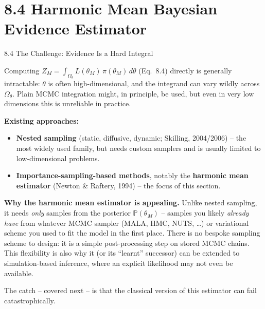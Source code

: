 \documentclass[aspectratio=169,10pt]{beamer}
\begin{document}
\section{8.4 Harmonic Mean Bayesian Evidence Estimator}

\begin{frame}[allowframebreaks]{8.4 The Challenge: Evidence Is a Hard Integral}

Computing $Z_M = \int_{\Omega_\theta} L(\theta_M)\, \pi(\theta_M)\, d\theta$ (Eq.\ 8.4) directly is generally intractable: $\theta$ is often high-dimensional, and the integrand can vary wildly across $\Omega_\theta$. Plain MCMC integration might, in principle, be used, but even in very low dimensions this is unreliable in practice.

\textbf{Existing approaches:}
\begin{itemize}
  \item \textbf{Nested sampling} (static, diffusive, dynamic; Skilling, 2004/2006) -- the most widely used family, but needs custom samplers and is usually limited to low-dimensional problems.
  \item \textbf{Importance-sampling-based methods}, notably the \textbf{harmonic mean estimator} (Newton \& Raftery, 1994) -- the focus of this section.
\end{itemize}

\framebreak

\textbf{Why the harmonic mean estimator is appealing.} Unlike nested sampling, it needs \emph{only} samples from the posterior $\mathbb{P}(\theta_M)$ -- samples you likely \emph{already have} from whatever MCMC sampler (MALA, HMC, NUTS, \dots) or variational scheme you used to fit the model in the first place. There is no bespoke sampling scheme to design: it is a simple post-processing step on stored MCMC chains. This flexibility is also why it (or its ``learnt'' successor) can be extended to simulation-based inference, where an explicit likelihood may not even be available.

The catch -- covered next -- is that the classical version of this estimator can fail catastrophically.

\end{frame}
\end{document}
